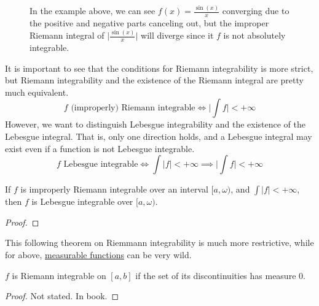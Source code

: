 \begin{figure}[H]
\begin{minipage}[b]{0.48\textwidth}
    \end{minipage}

    \caption{In the example above, we can see $f(x) = \frac{\sin(x)}{x}$ converging due to the positive and negative parts canceling out, but the improper Riemann integral of $\big| \frac{\sin(x)}{x} \big|$ will diverge since it $f$ is not absolutely integrable. }
    \label{fig:sinc_comparison}
  \end{figure}

  It is important to see that the conditions for Riemann integrability is more strict, but Riemann integrability and the existence of the Riemann integral are pretty much equivalent. 
  \begin{equation}
    f \text{ (improperly) Riemann integrable} \iff \bigg| \int f \bigg| < +\infty
  \end{equation}
  However, we want to distinguish Lebesgue integrability and the existence of the Lebesgue integral. That is, only one direction holds, and a Lebesgue integral may exist even if a function is not Lebesgue integrable. 
  \begin{equation}
    f \text{ Lebesgue integrable} \iff \int |f| < +\infty \implies \bigg| \int f \bigg| < +\infty
  \end{equation}

  \begin{theorem}
    \label{thm:conditions-of-lebesgue-integrability-from}
    If $f$ is improperly Riemann integrable over an interval $[a, \omega)$, and $\int |f| < +\infty$, then $f$ is Lebesgue integrable over $[a, \omega)$. 
  \end{theorem}
  \begin{proof}
    
  \end{proof}

  This following theorem on Riemmann integrability is much more restrictive, while for above, \hyperref[def:measurable-function]{measurable functions} can be very wild. 

  \begin{theorem}
    \label{thm:characterization-of-riemann-integrability}
    $f$ is Riemann integrable on $[a, b]$ if the set of its discontinuities has measure $0$. 
  \end{theorem}
  \begin{proof}
    Not stated. In book. 
  \end{proof}

